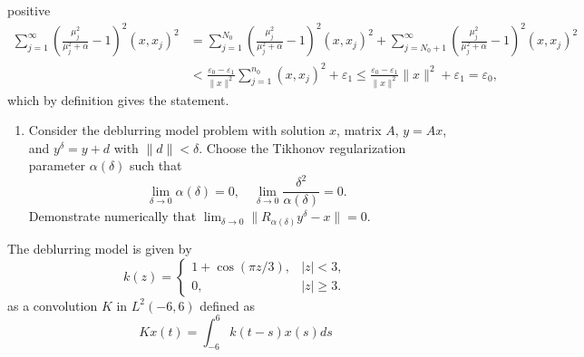     positive \[
        \begin{split}
            \sum_{j = 1}^{\infty} \left( \frac{\mu_j^2}{\mu_j^2 + \alpha} - 1  \right)^2 (x, x_j)^2 &= 
    \sum_{j = 1}^{N_0} \left( \frac{\mu_j^2}{\mu_j^2 + \alpha} - 1  \right)^2 (x, x_j)^2 +
            \sum_{j = N_0 + 1}^{\infty} \left( \frac{\mu_j^2}{\mu_j^2 + \alpha} - 1  \right)^2 (x, x_j)^2 \\
                                                                                                    &< \frac{ \varepsilon_0
                                                                                                    - \varepsilon_1
                                                                                                }{\|x\|^2} \sum_{j
                                                                                                = 1}^{n_0}  (x, x_j)^2
                                                                                                + \varepsilon_1 \le
                                                                                                \frac{\varepsilon_0
                                                                                                - \varepsilon_1}{\|x\|^2}
                                                                                                \|x\|^2 + \varepsilon_1
                                                                                                = \varepsilon_0,
        \end{split}
\] which by definition gives the statement.

\nopagebreak
\noindent\hrulefill
\begin{enumerate}[label = (\alph*), resume]
  \item Consider the deblurring model problem with solution $x$, matrix $A$, $y = Ax$, and $y^\delta = y + d$ with $\|d\| < \delta$. Choose the Tikhonov regularization parameter $\alpha(\delta)$ such that
      \[
	\lim_{\delta \to 0} \alpha(\delta) = 0, \quad \lim_{\delta \to 0}\frac{\delta^2}{\alpha(\delta)} = 0.
      \] 
Demonstrate numerically that $\lim_{\delta \to 0} \|R_{\alpha(\delta)}y^\delta - x\| = 0$.
\end{enumerate}
\nopagebreak
\noindent\hrulefill

The deblurring model is given by
    \[
        k(z) = \begin{cases}
        1 + \cos(\pi z/3), & |z| < 3, \\
        0, & |z| \geq 3.
        \end{cases}
    \] 
    as a convolution $K$ in $L^2(-6, 6)$ defined as
    \[
    Kx(t) = \int_{-6}^6 k(t-s)x(s)ds \tag{1}
    \] 

